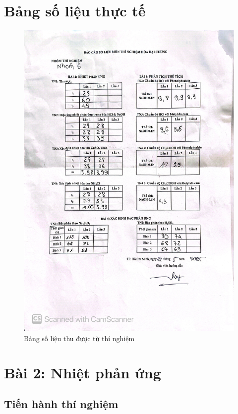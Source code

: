 \documentclass[12pt]{article}
\begin{document}
\section{Bảng số liệu thực tế}
\begin{figure}[H]
    \centering
    \includegraphics[scale=0.15]{img/Baocaosolieu.jpeg}
    \caption{Bảng số liệu thu được từ thí nghiệm}
    \label{fig:enter-label}
\end{figure}
\newpage
\section{Bài 2: Nhiệt phản ứng}
\subsection{Tiến hành thí nghiệm}
\end{document}
